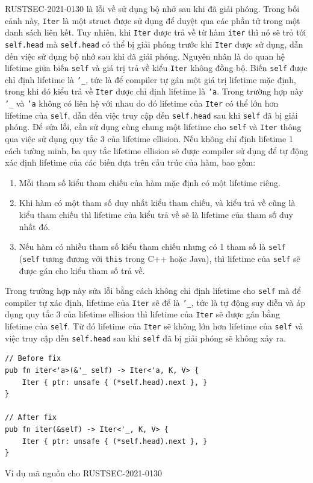 RUSTSEC-2021-0130 là lỗi về sử dụng bộ nhớ sau khi đã giải phóng. Trong bối cảnh này, \texttt{Iter} là một struct được sử dụng để duyệt qua các phần tử trong một danh sách liên kết. Tuy nhiên, khi \texttt{Iter} được trả về từ hàm \texttt{iter} thì nó sẽ trỏ tới \texttt{self.head} mà \texttt{self.head} có thể bị giải phóng trước khi \texttt{Iter} được sử dụng, dẫn đến việc sử dụng bộ nhớ sau khi đã giải phóng. Nguyên nhân là do quan hệ lifetime giữa biến \texttt{self} và giá trị trả về kiểu \texttt{Iter} không đồng bộ. Biến \texttt{self} được chỉ định lifetime là \texttt{'\_}, tức là để compiler tự gán một giá trị lifetime mặc định, trong khi đó kiểu trả về \texttt{Iter} được chỉ định lifetime là \texttt{'a}. Trong trường hợp này \texttt{'\_} và \texttt{'a} không có liên hệ với nhau do đó lifetime của \texttt{Iter} có thể lớn hơn lifetime của \texttt{self}, dẫn đến việc truy cập đến \texttt{self.head} sau khi \texttt{self} đã bị giải phóng. Để sửa lỗi, cần sử dụng cùng chung một lifetime cho \texttt{self} và \texttt{Iter} thông qua việc sử dụng quy tắc 3 của lifetime ellision. Nếu không chỉ định lifetime 1 cách tường minh, ba quy tắc lifetime ellision sẽ được compiler sử dụng để tự động xác định lifetime của các biến dựa trên cấu trúc của hàm, bao gồm:

\begin{enumerate}
    \item Mỗi tham số kiểu tham chiếu của hàm mặc định có một lifetime riêng.
    \item Khi hàm có một tham số duy nhất kiểu tham chiếu, và kiểu trả về cũng là kiểu tham chiếu thì lifetime của kiểu trả về sẽ là lifetime của tham số duy nhất đó.
    \item Nếu hàm có nhiều tham số kiểu tham chiếu nhưng có 1 tham số là \texttt{self} (\texttt{self} tương đương với \texttt{this} trong C++ hoặc Java), thì lifetime của \texttt{self} sẽ được gán cho kiểu tham số trả về.
\end{enumerate}

Trong trường hợp này sửa lỗi bằng cách không chỉ định lifetime cho \texttt{self} mà để compiler tự xác định, lifetime của \texttt{Iter} sẽ để là \texttt{'\_}, tức là tự động suy diễn và áp dụng quy tắc 3 của lifetime ellision thì lifetime của \texttt{Iter} sẽ được gán bằng lifetime của \texttt{self}. Từ đó lifetime của \texttt{Iter} sẽ không lớn hơn lifetime của \texttt{self} và việc truy cập đến \texttt{self.head} sau khi \texttt{self} đã bị giải phóng sẽ không xảy ra.

\begin{listing}[H]
\begin{verbatim}
// Before fix
pub fn iter<'a>(&'_ self) -> Iter<'a, K, V> {
    Iter { ptr: unsafe { (*self.head).next }, }
}

// After fix
pub fn iter(&self) -> Iter<'_, K, V> {
    Iter { ptr: unsafe { (*self.head).next }, }
}
\end{verbatim}
\caption{Ví dụ mã nguồn cho RUSTSEC-2021-0130}
\label{code:c4_RUSTSEC-2021-0130}
\end{listing}

